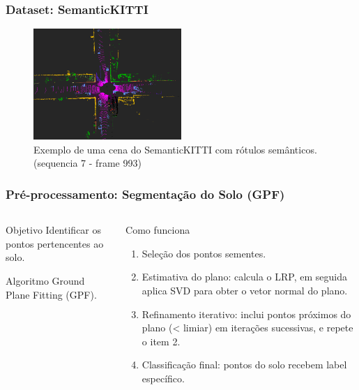 \documentclass[aspectratio=169,t,xcolor=table]{beamer}
\begin{document}
\begin{frame}
    \frametitle{Dataset: SemanticKITTI}
    \begin{figure}
        \centering
        \includegraphics [width=0.5\textwidth]{figs/final-true1t.png}
        \caption {Exemplo de uma cena do SemanticKITTI com rótulos semânticos.
            (sequencia 7 - frame 993)}
    \end{figure}
\end{frame}

\begin{frame}
    \frametitle{Pré-processamento: Segmentação do Solo (GPF)}
    \begin{columns}[T]
        \begin{column}{.4\textwidth}
            \begin{block}{Objetivo}
                \vspace{1.5em}
                Identificar os pontos pertencentes ao solo.
                \vspace{1.5em}
            \end{block}
            \begin{block}{Algoritmo}
                \vspace{1.5em}
                Ground Plane Fitting (GPF).
                \vspace{1.5em}
            \end{block}
        \end{column}
        \begin{column}{.6\textwidth}
            \begin{block}{Como funciona}
                \begin{enumerate}[<+->]
                    \item Seleção dos pontos sementes.
                    \item Estimativa do plano: calcula o LRP, em seguida aplica
                          SVD para obter o vetor normal do plano.
                    \item Refinamento iterativo: inclui pontos próximos do plano
                          (< limiar) em iterações sucessivas, e repete o item 2.
                    \item Classificação final: pontos do solo recebem label
                          específico.
                \end{enumerate}
            \end{block}
        \end{column}
    \end{columns}
\end{frame}
\end{document}
